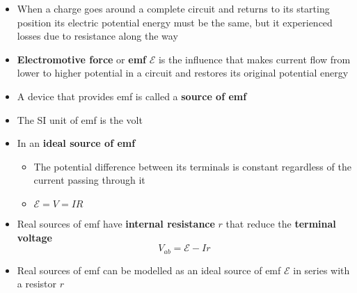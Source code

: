 \documentclass{article}
\begin{document}
\begin{itemize}
  \item When a charge goes around a complete circuit and returns to its starting position its electric potential energy must be the same, but it experienced losses due to resistance along the way

  \item \textbf{Electromotive force} or \textbf{emf} $\mathcal{E}$ is the influence that makes current flow from lower to higher potential in a circuit and restores its original potential energy

  \item A device that provides emf is called a \textbf{source of emf}

  \item The SI unit of emf is the volt

  \item In an \textbf{ideal source of emf}

        \begin{itemize}
          \item The potential difference between its terminals is constant regardless of the current passing through it

          \item $\mathcal{E} = V = I R$
        \end{itemize}

  \item Real sources of emf have \textbf{internal resistance} $r$ that reduce the \textbf{terminal voltage} \[V_{ab} = \mathcal{E} - I r\]

  \item Real sources of emf can be modelled as an ideal source of emf $\mathcal{E}$ in series with a resistor $r$
\end{itemize}
\end{document}
